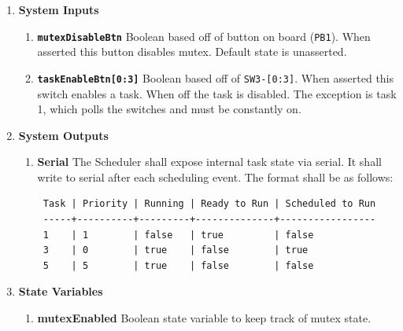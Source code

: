 \documentclass{article}
\newcommand{\bitem}[1]{\item \textbf{#1}}
\begin{document}
\begin{enumerate}
\bitem{System Inputs}
	\begin{enumerate}
	\bitem{\texttt{mutexDisableBtn}} Boolean based off of button on board (\texttt{PB1}). When asserted this button disables mutex. Default state is unasserted.
	\bitem{\texttt{taskEnableBtn[0:3]}} Boolean based off of \texttt{SW3-[0:3]}. When asserted this switch enables a task. When off the task is disabled. The exception is task 1, which polls the switches and must be constantly on.
	\end{enumerate}
\bitem{System Outputs}
	\begin{enumerate}
	\bitem{Serial} The Scheduler shall expose internal task state via serial. It shall write to serial after each scheduling event. The format shall be as follows:
        \begin{verbatim}
 Task | Priority | Running | Ready to Run | Scheduled to Run
 -----+----------+---------+--------------+-----------------
 1    | 1        | false   | true         | false
 3    | 0        | true    | false        | true
 5    | 5        | true    | false        | false
        \end{verbatim}
	\end{enumerate}
\bitem{State Variables}
	\begin{enumerate}
	\bitem{mutexEnabled} Boolean state variable to keep track of mutex state.
	\end{enumerate}

\newpage


\end{enumerate}
\end{document}
